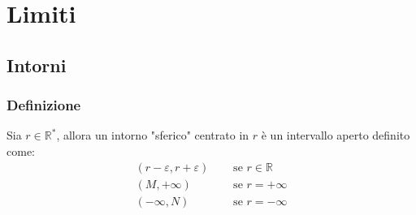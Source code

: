 \documentclass[a4paper]{article}
\begin{document}
\newpage

\section{Limiti}
\subsection{Intorni}
\subsubsection*{Definizione}
Sia \(r \in \mathbb{R}^*\), allora un intorno "sferico" centrato in \(r\) è un intervallo aperto definito come:
\begin{align*}
	\left( r - \varepsilon, r + \varepsilon \right) \quad & \text{ se } r \in \mathbb{R} \\
	\left( M, +\infty \right) \quad & \text{ se } r = + \infty\\
	\left( -\infty, N \right) \quad & \text{ se } r = - \infty
\end{align*}
\end{document}
